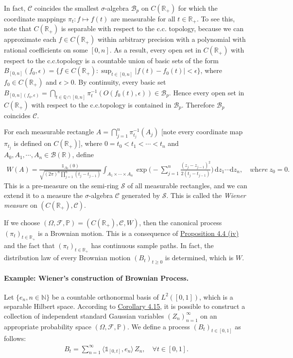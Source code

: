 \documentclass{article}
\numberwithin{equation}{section}
\renewcommand{\P}{\mathbb{P}}
\renewcommand{\d}{\mathrm{d}}
\theoremstyle{plain}
\theoremstyle{definition}
\begin{document}
In fact, $\mathscr{C}$ coincides the smallest $\sigma$-algebra $\mathscr{B}_p$ on $C(\mathbb{R}_+)$ for which the coordinate mappings $\pi_t:f\mapsto f(t)$ are measurable for all $t\in\mathbb{R}_+$. To see this, note that $C(\mathbb{R}_+)$ is separable with respect to the c.c. topology, because we can approximate each $f\in C(\mathbb{R}_+)$ within arbitrary precision with a polynomial with rational coefficients on some $[0,n]$. As a result, every open set in $C(\mathbb{R}_+)$ with respect to the c.c.topology is a countable union of basic sets of the form $B_{[0,n]}(f_0,\epsilon)=\{f\in C(\mathbb{R}_+):\sup_{t\in[0,n]}\vert f(t)-f_0(t)\vert<\epsilon\}$, where $f_0\in C(\mathbb{R}_+)$ and $\epsilon>0$. By continuity, every basic set $B_{[0,n](f_0,\epsilon)}=\bigcap_{t\in\mathbb{Q}\cap[0,n]}\pi_t^{-1}(O(f_0(t),\epsilon))\in\mathscr{B}_p$. Hence every open set in $C(\mathbb{R}_+)$ with respect to the c.c.topology is contained in $\mathscr{B}_p$. Therefore $\mathscr{B}_p$ coincides $\mathscr{C}$.

For each measurable rectangle $A=\bigcap_{j=1}^n \pi_{t_j}^{-1}(A_j)$ [note every coordinate map $\pi_{t_j}$ is defined on $C(\mathbb{R}_+)$], where $0=t_0<t_1<\cdots<t_n$ and $A_0,A_1,\cdots,A_n\in\mathscr{B}(\mathbb{R})$, define
\begin{align*}
	W(A)=\frac{\mathds{1}_{A_0}(0)}{\sqrt{(2\pi)^n\prod_{j=1}^n(t_j-t_{j-1})}}\int_{A_1\times\cdots\times A_n}\exp\biggl(-\sum_{j=1}^n\frac{(z_j-z_{j-1})^2}{2(t_j-t_{j-1})}\biggr)\,\d z_1\cdots \d z_n,\quad\textit{where}\ z_0=0.
\end{align*}
This is a pre-measure on the semi-ring $\mathscr{S}$ of all measurable rectangles, and we can extend it to a measure the $\sigma$-algebra $\mathscr{C}$ generated by $\mathscr{S}$. This is called the \textit{Wiener measure} on $(C(\mathbb{R}_+),\mathscr{C})$.

If we choose $(\Omega,\mathscr{F},\P)=(C(\mathbb{R}_+),\mathscr{C},W)$, then the canonical process $(\pi_t)_{t\in\mathbb{R}_+}$ is a Brownian motion. This is a consequence of \hyperref[prop:4.4]{Proposition 4.4 (iv)} and the fact that $(\pi_t)_{t\in\mathbb{R}_+}$ has continuous sample paths. In fact, the distribution law of every Brownian motion $(B_t)_{t\geq 0}$ is determined, which is $W$. 

\paragraph{Example: Wiener's construction of Brownian Process.} Let $\{e_n,n\in\mathbb{N}\}$ be a countable orthonormal basis of $L^2([0,1])$, which is a separable Hilbert space. According to \hyperref[cor:4.15]{Corollary 4.15}, it is possible to construct a collection of independent standard Gaussian variables $(Z_n)_{n=1}^\infty$ on an appropriate probability space $(\Omega,\mathscr{F},\P)$.  We define a process $(B_t)_{t\in[0,1]}$ as follows:
\begin{align*}
	B_t=\sum_{n=1}^\infty \langle \mathds{1}_{[0,t]}, e_n\rangle\,Z_n,\quad \forall t\in[0,1].\tag{4.2}\label{eq:4.2}
\end{align*}
\end{document}
